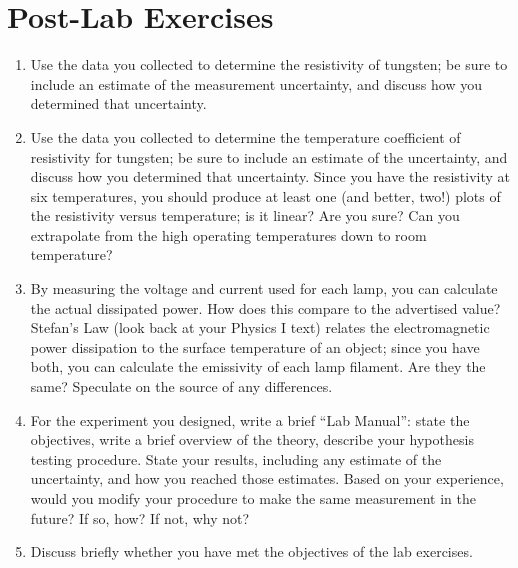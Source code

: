 \documentclass[12pt]{article}
\begin{document}
\section*{Post-Lab Exercises}

\begin{enumerate}
\item Use the data you collected to determine the resistivity of
  tungsten; be sure to include an estimate of the measurement
  uncertainty, and discuss how you determined that uncertainty.
\item Use the data you collected to determine the temperature
  coefficient of resistivity for tungsten; be sure to include an
  estimate of the uncertainty, and discuss how you determined that
  uncertainty.  Since you have the resistivity at six temperatures,
  you should produce at least one (and better, two!) plots of the
  resistivity versus temperature; is it linear?  Are you sure?  Can
  you extrapolate from the high operating temperatures down to room
  temperature? 
\item By measuring the voltage and current used for each lamp, you can
  calculate the actual dissipated power.  How does this compare to the
  advertised value?  Stefan's Law (look back at your Physics I text)
  relates the electromagnetic power dissipation to the surface
  temperature of an object; since you have both, you can calculate the
  emissivity of each lamp filament.  Are they the same?  Speculate on
  the source of any differences.
\item For the experiment you designed, write a brief ``Lab Manual'':
  state the objectives, write a brief overview of the theory, describe
  your hypothesis testing procedure.  State your results, including
  any estimate of the uncertainty, and how you reached those
  estimates.  Based on your experience, would you modify your
  procedure to make the same measurement in the future?  If so, how?
  If not, why not?
\item Discuss briefly whether you have met the objectives of the lab
  exercises. 
\end{enumerate}
\end{document}

